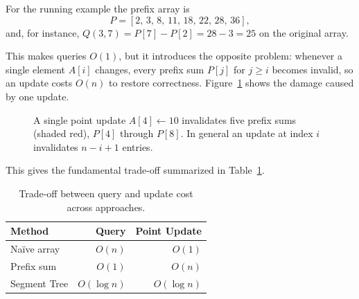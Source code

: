 For the running example the prefix array is
\[
P = [2,\,3,\,8,\,11,\,18,\,22,\,28,\,36],
\]
and, for instance, $Q(3,7) = P[7]-P[2] = 28-3 = 25$ on the original array.

This makes queries $O(1)$, but it introduces the opposite problem: whenever a single element $A[i]$ changes, every prefix sum $P[j]$ for $j \ge i$ becomes invalid, so an update costs $O(n)$ to restore correctness. Figure~\ref{fig:prefixupdate} shows the damage caused by one update.

\begin{figure}[h]
\centering
{}
\caption{A single point update $A[4]\leftarrow 10$ invalidates five prefix sums (shaded red), $P[4]$ through $P[8]$. In general an update at index $i$ invalidates $n-i+1$ entries.}
\label{fig:prefixupdate}
\end{figure}

This gives the fundamental trade-off summarized in Table~\ref{tab:tradeoff}.

\begin{table}[h]
\centering
\caption{Trade-off between query and update cost across approaches.}
\label{tab:tradeoff}
\begin{tabular}{lrr}
\toprule
\textbf{Method} & \textbf{Query} & \textbf{Point Update} \\
\midrule
Na\"ive array  & $O(n)$      & $O(1)$ \\
Prefix sum     & $O(1)$      & $O(n)$ \\
Segment Tree   & $O(\log n)$ & $O(\log n)$ \\
\bottomrule
\end{tabular}
\end{table}

